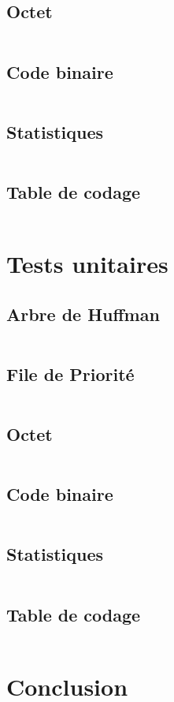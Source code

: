 \documentclass[12pt,a4paper]{article}
\begin{document}
\subsection{Octet}
    \inputminted[breaklines]{c}{../code/src/octet.c}
\subsection{Code binaire}
    \inputminted[breaklines]{c}{../code/src/codeBinaire.c}
\subsection{Statistiques}
    \inputminted[breaklines]{c}{../code/src/stats.c}
\subsection{Table de codage}
    \inputminted[breaklines]{c}{../code/src/table.c}

\newpage

\section{Tests unitaires}
\subsection{Arbre de Huffman}
    \inputminted[breaklines]{c}{../code/src/tests/testArbre.c}
\subsection{File de Priorité}
    \inputminted[breaklines=true, breakanywhere=true]{c}{../code/src/tests/testFile.c}
\subsection{Octet}
    \inputminted[breaklines]{c}{../code/src/tests/testOctet.c}
\subsection{Code binaire}
    \inputminted[breaklines]{c}{../code/src/tests/testCodeBinaire.c}
\subsection{Statistiques}
    \inputminted[breaklines]{c}{../code/src/tests/testStats.c}
\subsection{Table de codage}
    \inputminted[breaklines]{c}{../code/src/tests/testTable.c}

\newpage

\section{Conclusion}


\end{document}
